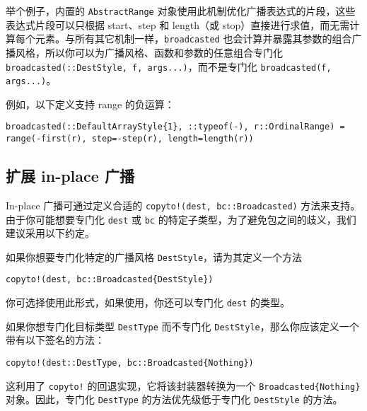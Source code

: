 举个例子，内置的 \texttt{AbstractRange} 对象使用此机制优化广播表达式的片段，这些表达式片段可以只根据 start、step 和 length（或 stop）直接进行求值，而无需计算每个元素。与所有其它机制一样，\texttt{broadcasted} 也会计算并暴露其参数的组合广播风格，所以你可以为广播风格、函数和参数的任意组合专门化 \texttt{broadcasted(::DestStyle, f, args...)}，而不是专门化 \texttt{broadcasted(f, args...)}。



例如，以下定义支持 range 的负运算：




\begin{verbatim}
broadcasted(::DefaultArrayStyle{1}, ::typeof(-), r::OrdinalRange) = range(-first(r), step=-step(r), length=length(r))
\end{verbatim}



\hypertarget{13437862742050583795}{}


\subsection{扩展 in-place 广播}



In-place 广播可通过定义合适的 \texttt{copyto!(dest, bc::Broadcasted)} 方法来支持。由于你可能想要专门化 \texttt{dest} 或 \texttt{bc} 的特定子类型，为了避免包之间的歧义，我们建议采用以下约定。



如果你想要专门化特定的广播风格 \texttt{DestStyle}，请为其定义一个方法




\begin{verbatim}
copyto!(dest, bc::Broadcasted{DestStyle})
\end{verbatim}



你可选择使用此形式，如果使用，你还可以专门化 \texttt{dest} 的类型。



如果你想专门化目标类型 \texttt{DestType} 而不专门化 \texttt{DestStyle}，那么你应该定义一个带有以下签名的方法：




\begin{verbatim}
copyto!(dest::DestType, bc::Broadcasted{Nothing})
\end{verbatim}



这利用了 \texttt{copyto!} 的回退实现，它将该封装器转换为一个 \texttt{Broadcasted\{Nothing\}} 对象。因此，专门化 \texttt{DestType} 的方法优先级低于专门化 \texttt{DestStyle} 的方法。



